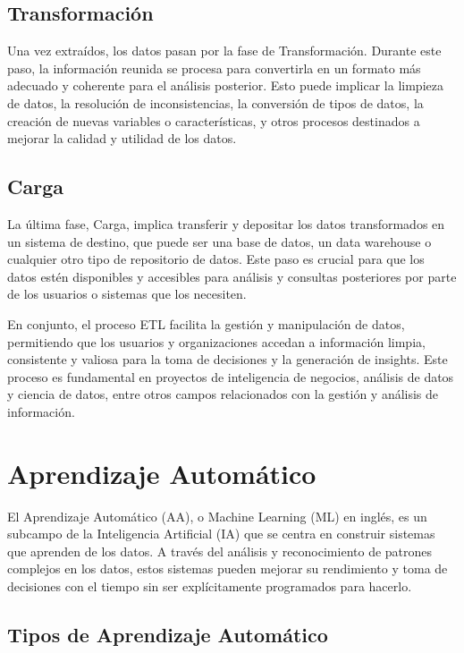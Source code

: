 \subsection{Transformación}

Una vez extraídos, los datos pasan por la fase de Transformación. Durante este paso, la información reunida se procesa para convertirla en un formato más adecuado y coherente para el análisis posterior. Esto puede implicar la limpieza de datos, la resolución de inconsistencias, la conversión de tipos de datos, la creación de nuevas variables o características, y otros procesos destinados a mejorar la calidad y utilidad de los datos.

\subsection{Carga}

La última fase, Carga, implica transferir y depositar los datos transformados en un sistema de destino, que puede ser una base de datos, un data warehouse o cualquier otro tipo de repositorio de datos. Este paso es crucial para que los datos estén disponibles y accesibles para análisis y consultas posteriores por parte de los usuarios o sistemas que los necesiten.

En conjunto, el proceso ETL facilita la gestión y manipulación de datos, permitiendo que los usuarios y organizaciones accedan a información limpia, consistente y valiosa para la toma de decisiones y la generación de insights. Este proceso es fundamental en proyectos de inteligencia de negocios, análisis de datos y ciencia de datos, entre otros campos relacionados con la gestión y análisis de información.

\section{Aprendizaje Automático}

El Aprendizaje Automático (AA), o Machine Learning (ML) en inglés, es un subcampo de la Inteligencia Artificial (IA) que se centra en construir sistemas que aprenden de los datos. A través del análisis y reconocimiento de patrones complejos en los datos, estos sistemas pueden mejorar su rendimiento y toma de decisiones con el tiempo sin ser explícitamente programados para hacerlo.

\subsection{Tipos de Aprendizaje Automático}

